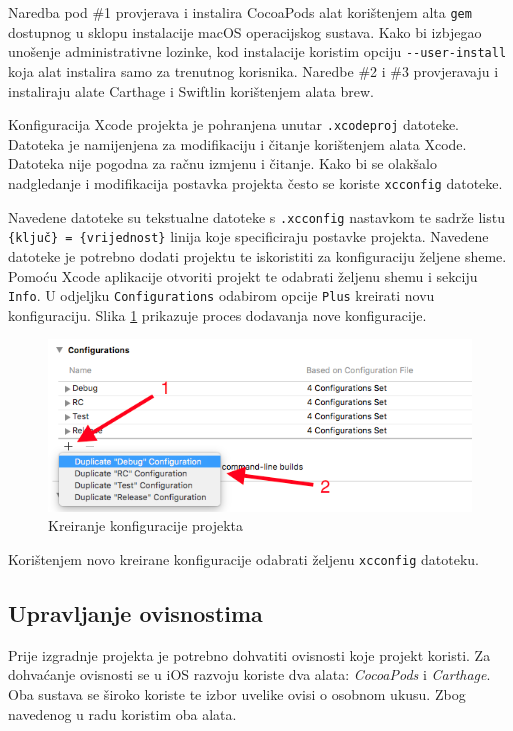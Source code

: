 \documentclass[times, utf8, diplomski, numeric]{fer}
\begin{document}
Naredba pod \#1 provjerava i instalira CocoaPods alat korištenjem alta \verb|gem| dostupnog u sklopu instalacije macOS operacijskog sustava. Kako bi izbjegao unošenje administrativne lozinke, kod instalacije koristim opciju \verb|--user-install| koja alat instalira samo za trenutnog korisnika. Naredbe \#2 i \#3 provjeravaju i instaliraju alate Carthage i Swiftlin korištenjem alata brew.


Konfiguracija Xcode projekta je pohranjena unutar \verb|.xcodeproj| datoteke. Datoteka je namijenjena za modifikaciju i čitanje korištenjem alata Xcode. Datoteka nije pogodna za račnu izmjenu i čitanje. Kako bi se olakšalo nadgledanje i modifikacija postavka projekta često se koriste \verb|xcconfig| datoteke.

Navedene datoteke su tekstualne datoteke s \verb|.xcconfig| nastavkom te sadrže listu \verb|{ključ} = {vrijednost}| linija koje specificiraju postavke projekta. Navedene datoteke je potrebno dodati projektu te iskoristiti za konfiguraciju željene sheme. Pomoću Xcode aplikacije otvoriti projekt te odabrati željenu shemu i sekciju \verb|Info|. U odjeljku \verb|Configurations| odabirom opcije \verb|Plus| kreirati novu konfiguraciju. Slika \ref{fig:XcodeConfigurations} prikazuje proces dodavanja nove konfiguracije.

\begin{figure}[h!]
\centering
\includegraphics[scale=0.7]{XcodeConfigurations}
\caption{Kreiranje konfiguracije projekta}
\label{fig:XcodeConfigurations}
\end{figure}

Korištenjem novo kreirane konfiguracije odabrati željenu \verb|xcconfig| datoteku.

\subsection{Upravljanje ovisnostima}

Prije izgradnje projekta je potrebno dohvatiti ovisnosti koje projekt koristi. Za dohvaćanje ovisnosti se u iOS razvoju koriste dva alata: \textit{CocoaPods} i \textit{Carthage}. Oba sustava se široko koriste te izbor uvelike ovisi o osobnom ukusu. Zbog navedenog u radu koristim oba alata.
\end{document}
